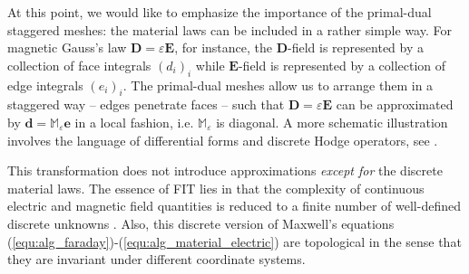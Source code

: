 \documentclass{article}
\begin{document}
At this point, we would like to emphasize the importance of the primal-dual staggered meshes: the material laws can be included in a rather simple way. For magnetic Gauss's law $\mathbf{D} = \varepsilon \mathbf{E}$, for instance, the $\mathbf{D}$-field is represented by a collection of face integrals $ (d_i)_{i}$ while $\mathbf{E}$-field is represented by a collection of edge integrals $ (e_i)_{i}$. The primal-dual meshes allow us to arrange them in a staggered way -- edges penetrate faces -- such that $\mathbf{D} = \varepsilon \mathbf{E}$ can be approximated by $\mathbf{d} = \mathbb{M}_{\varepsilon}\mathbf{e}$ in a local fashion, i.e. $\mathbb{M}_{\varepsilon}$ is diagonal. A more schematic illustration involves the language of differential forms and discrete Hodge operators, see \cite{bossavit1999, teixeira_1999, hip_1999}. 

This transformation does not introduce approximations \emph{except for} the discrete material laws. The essence of FIT lies in that the complexity of continuous electric and magnetic field quantities
is reduced to a finite number of well-defined discrete unknowns \citep{weiland_2003}. Also, this discrete version of Maxwell's equations (\ref{equ:alg_faraday})-(\ref{equ:alg_material_electric}) are topological in the sense that they are invariant under different coordinate systems.
\end{document}
